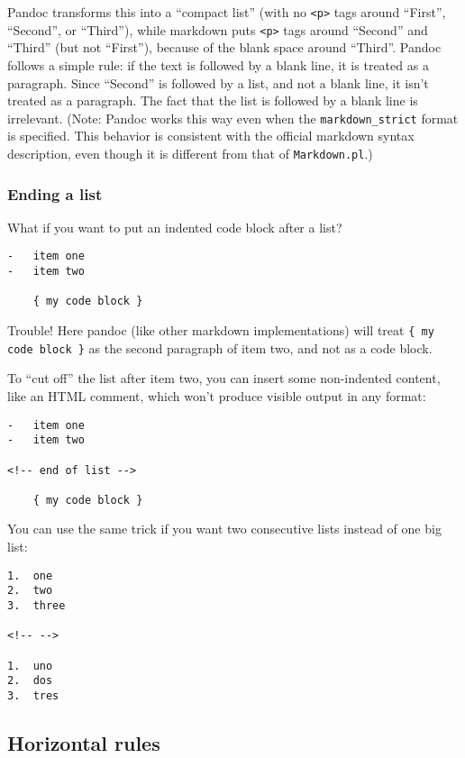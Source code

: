 \documentclass[]{article}
\begin{document}
Pandoc transforms this into a ``compact list'' (with no
\texttt{\textless{}p\textgreater{}} tags around ``First'', ``Second'',
or ``Third''), while markdown puts \texttt{\textless{}p\textgreater{}}
tags around ``Second'' and ``Third'' (but not ``First''), because of the
blank space around ``Third''. Pandoc follows a simple rule: if the text
is followed by a blank line, it is treated as a paragraph. Since
``Second'' is followed by a list, and not a blank line, it isn't treated
as a paragraph. The fact that the list is followed by a blank line is
irrelevant. (Note: Pandoc works this way even when the
\texttt{markdown\_strict} format is specified. This behavior is
consistent with the official markdown syntax description, even though it
is different from that of \texttt{Markdown.pl}.)

\subsubsection{Ending a list}

What if you want to put an indented code block after a list?

\begin{verbatim}
-   item one
-   item two

    { my code block }
\end{verbatim}

Trouble! Here pandoc (like other markdown implementations) will treat
\texttt{\{ my code block \}} as the second paragraph of item two, and
not as a code block.

To ``cut off'' the list after item two, you can insert some non-indented
content, like an HTML comment, which won't produce visible output in any
format:

\begin{verbatim}
-   item one
-   item two

<!-- end of list -->

    { my code block }
\end{verbatim}

You can use the same trick if you want two consecutive lists instead of
one big list:

\begin{verbatim}
1.  one
2.  two
3.  three

<!-- -->

1.  uno
2.  dos
3.  tres
\end{verbatim}

\subsection{Horizontal rules}
\end{document}
